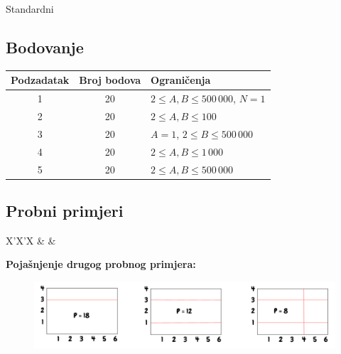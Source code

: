\begin{statement}[
  problempoints=100,
  timelimit=3 sekunde,
  memorylimit=512 MiB,
]{Standardni}
\subsection*{Bodovanje}
{\renewcommand{\arraystretch}{1.4}
  \setlength{\tabcolsep}{6pt}
  \begin{tabular}{ccl}
 Podzadatak & Broj bodova & Ograničenja \\ \midrule
  1 & 20 & $2 \le A, B \le 500\,000$, $N = 1$\\
  2 & 20 & $2 \le A, B \le 100$ \\
  3 & 20 & $A = 1$, $2 \le B \le 500\,000$ \\
  4 & 20 & $2 \le A, B \le 1\,000$ \\
  5 & 20 & $2 \le A, B \le 500\,000$ \\
\end{tabular}}

\subsection*{Probni primjeri}
\begin{tabularx}{\textwidth}{X'X'X}
 &
 &
\end{tabularx}

\textbf{Pojašnjenje drugog probnog primjera:}
\begin{figure}[H]
\centering
\includegraphics[width=\textwidth]{img/standardni_skica.png}
\end{figure}

\end{statement}


